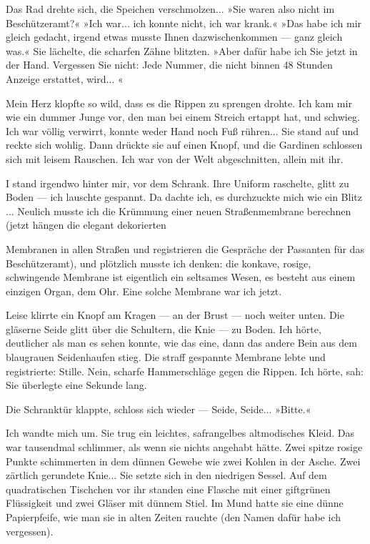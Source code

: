 Das Rad drehte sich, die Speichen verschmolzen... »Sie waren also
nicht im Beschützeramt?« »Ich war... ich konnte nicht, ich war
krank.« »Das habe ich mir gleich gedacht, irgend etwas musste Ihnen
dazwischenkommen — ganz gleich was.« Sie lächelte, die scharfen
Zähne blitzten. »Aber dafür habe ich Sie jetzt in der Hand.
Vergessen Sie nicht: Jede Nummer, die nicht binnen 48 Stunden
Anzeige erstattet, wird... «

Mein Herz klopfte so wild, dass es die Rippen zu sprengen drohte.
Ich kam mir wie ein dummer Junge vor, den man bei einem Streich
ertappt hat, und schwieg. Ich war völlig verwirrt, konnte weder
Hand noch Fuß rühren... Sie stand auf und reckte sich wohlig. Dann
drückte sie auf einen Knopf, und die Gardinen schlossen sich mit
leisem Rauschen. Ich war von der Welt abgeschnitten, allein mit
ihr.

I stand irgendwo hinter mir, vor dem Schrank. Ihre Uniform
raschelte, glitt zu Boden — ich lauschte gespannt. Da dachte ich,
es durchzuckte mich wie ein Blitz ... Neulich musste ich die
Krümmung einer neuen Straßenmembrane berechnen (jetzt hängen die
elegant dekorierten

Membranen in allen Straßen und registrieren die Gespräche der
Passanten für das Beschützeramt), und plötzlich musste ich denken:
die konkave, rosige, schwingende Membrane ist eigentlich ein
seltsames Wesen, es besteht aus einem einzigen Organ, dem Ohr. Eine
solche Membrane war ich jetzt.

Leise klirrte ein Knopf am Kragen — an der Brust — noch weiter
unten. Die gläserne Seide glitt über die Schultern, die Knie — zu
Boden. Ich hörte, deutlicher als man es sehen konnte, wie das eine,
dann das andere Bein aus dem blaugrauen Seidenhaufen stieg. Die
straff gespannte Membrane lebte und registrierte: Stille. Nein,
scharfe Hammerschläge gegen die Rippen. Ich hörte, sah: Sie
überlegte eine Sekunde lang.

Die Schranktür klappte, schloss sich wieder — Seide, Seide...
»Bitte.«

Ich wandte mich um. Sie trug ein leichtes, safrangelbes
altmodisches Kleid. Das war tausendmal schlimmer, als wenn sie
nichts angehabt hätte. Zwei spitze rosige Punkte schimmerten in dem
dünnen Gewebe wie zwei Kohlen in der Asche. Zwei zärtlich gerundete
Knie... Sie setzte sich in den niedrigen Sessel. Auf dem
quadratischen Tischchen vor ihr standen eine Flasche mit einer
giftgrünen Flüssigkeit und zwei Gläser mit dünnem Stiel. Im Mund
hatte sie eine dünne Papierpfeife, wie man sie in alten Zeiten
rauchte (den Namen dafür habe ich vergessen).

